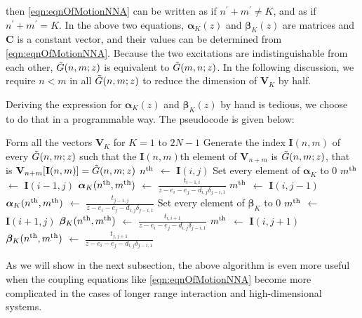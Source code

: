 then \autoref{eqn:eqnOfMotionNNA} can be written as
if $n^{\prime} + m^{\prime} \neq K$, and as
if $n^{\prime} + m^{\prime} = K$. In the above two equations, $\boldsymbol\alpha_{K}(z)$ and
 $\boldsymbol\beta_{K}(z)$
are matrices and $\mathbf{C}$ is a constant vector, and their values can be determined from 
\autoref{eqn:eqnOfMotionNNA}. Because the two excitations are indistinguishable from each other, $\Tilde{G}(n, m; z)$ is equivalent 
to $\Tilde{G}(m, n; z)$. In the following discussion, we require $n<m$ in all $\Tilde{G}(n, m; z)$ to reduce the dimension
 of $\mathbf{V}_{K}$ by half.

 Deriving the expression for $\boldsymbol\alpha_{K}(z)$ and
 $\boldsymbol\beta_{K}(z)$ by hand is tedious, we choose to do that in a programmable way. The 
pseudocode is given below:
\begin{algorithmic}[1]
\State Form all the vectors $\mathbf{V}_{K}$ for $K=1$ to $2N-1$
\State Generate the index $\mathbf{I}(n,m)$ of every $\Tilde{G}(n, m; z)$ such that the $\mathbf{I}(n,m)$th element 
of $\mathbf{V}_{n+m}$ is $\Tilde{G}(n, m; z)$, that is $\mathbf{V}_{n+m}[\mathbf{I}(n,m)] = \Tilde{G}(n, m; z)$
     \State $n^{\rm th}$ $\gets$ $\mathbf{I}(i,j)$
     \State Set every element of $\boldsymbol\alpha_{K}$ to 0
                   \State $m^{\rm th}$ $\gets$ $ \mathbf{I}(i-1, j)$  
                   \State $\boldsymbol\alpha_{K}(n^{\rm th}, m^{\rm th})$ $\gets$ $\frac{t_{i-1, i}}{z - e_{i} - e_{j} -   d_{i, j} \delta_{j-i, 1}}$
       \EndIf
%
                   \State $m^{\rm th}$ $\gets$ $ \mathbf{I}(i, j-1)$  
                   \State $\boldsymbol\alpha_{K}(n^{\rm th}, m^{\rm th})$ $\gets$ $\frac{t_{j-1, j}}{z - e_{i} - e_{j} -   d_{i, j} \delta_{j-i, 1}}$
       \EndIf
        \State Set every element of $\boldsymbol\beta_{K}$ to 0
                   \State $m^{\rm th}$ $\gets$ $ \mathbf{I}(i+1, j)$  
                   \State $\boldsymbol\beta_{K}(n^{\rm th}, m^{\rm th})$ $\gets$ $\frac{t_{i, i+1}}{z - e_{i} - e_{j} -   d_{i, j} \delta_{j-i, 1}}$
       \EndIf
%
                   \State $m^{\rm th}$ $\gets$ $ \mathbf{I}(i, j+1)$  
                   \State $\boldsymbol\beta_{K}(n^{\rm th}, m^{\rm th})$ $\gets$ $\frac{t_{j, j+1}}{z - e_{i} - e_{j} -   d_{i, j} \delta_{j-i, 1}}$
       \EndIf
\EndFor
\end{algorithmic}
As we will show in the next subsection, the above algorithm is even more useful when the coupling equations like
\autoref{eqn:eqnOfMotionNNA} become more complicated in the cases of
 longer range interaction and high-dimensional systems.

